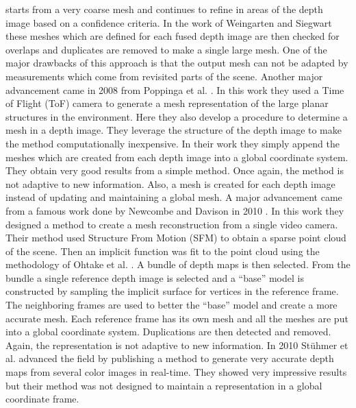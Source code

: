 \documentclass[12pt]{article}
\begin{document}
starts from a very coarse mesh and continues to refine in areas of the
depth image based on a confidence criteria. In the work of Weingarten and
Siegwart these meshes which are defined for each fused depth image are then
checked for overlaps and duplicates are removed to make a single large
mesh. One of the major drawbacks of this approach is that the output mesh
can not be adapted by measurements which come from revisited parts of the
scene. Another major advancement came in 2008 from Poppinga et al.
\cite{Poppinga2008}. In this work they used a Time of Flight (ToF) camera
to generate a mesh representation of the large planar structures in the
environment. Here they also develop a procedure to determine a mesh in a
depth image. They leverage the structure of the depth image to make the
method computationally inexpensive. In their work they simply append the
meshes which are created from each depth image into a global coordinate
system. They obtain very good results from a simple method.  Once
again, the method is not adaptive to new information. Also, a mesh is
created for each depth image instead of updating and maintaining a global
mesh. A major advancement came from a famous work done by Newcombe and
Davison in 2010 \cite{Newcombe2010}. In this work they designed a method to
create a mesh reconstruction from a single video camera. Their method used
Structure From Motion (SFM) to obtain a sparse point cloud of the scene.
Then an implicit function was fit to the point cloud using the methodology
of Ohtake et al.  \cite{Ohtake2003}. A bundle of depth maps is then
selected. From the bundle a single reference depth image is selected and a
``base'' model is constructed by sampling the implicit surface for vertices
in the reference frame. The neighboring frames are used to better the
``base'' model and create a more accurate mesh. Each reference frame has
its own mesh and all the meshes are put into a global coordinate system.
Duplications are then detected and removed. Again, the representation is
not adaptive to new information. In 2010 St\"{u}hmer et al.
\cite{Stuhmer2010} advanced the field by publishing a method to generate
very accurate depth maps from several color images in real-time. They
showed very impressive results but their method was not designed to maintain
a representation in a global coordinate frame. 
\end{document}
